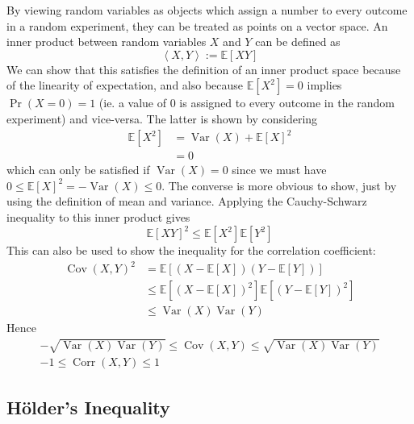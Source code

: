 \documentclass[11pt]{report} %
\begin{document}
By viewing random variables as objects which assign a number to every outcome in a random experiment, they can be treated as points on a vector space. An inner product between random variables $X$ and $Y$ can be defined as
\begin{equation}
\left\langle X, Y\right\rangle := \mathbb{E}\left[XY\right]
\end{equation}
We can show that this satisfies the definition of an inner product space because of the linearity of expectation, and also because $\mathbb{E}\left[X^{2}\right] = 0$ implies $\operatorname{Pr}\left(X = 0\right) = 1$ (ie. a value of $0$ is assigned to every outcome in the random experiment) and vice-versa. The latter is shown by considering
\begin{align}
\mathbb{E}\left[X^{2}\right] &= \operatorname{Var}\left(X\right) + \mathbb{E}\left[X\right]^{2} \\
&= 0
\end{align}
which can only be satisfied if $\operatorname{Var}\left(X\right) = 0$ since we must have $0 \leq \mathbb{E}\left[X\right]^{2} = -\operatorname{Var}\left(X\right) \leq 0$. The converse is more obvious to show, just by using the definition of mean and variance. Applying the Cauchy-Schwarz inequality to this inner product gives
\begin{equation}
\mathbb{E}\left[XY\right]^{2} \leq \mathbb{E}\left[X^{2}\right]\mathbb{E}\left[Y^{2}\right]
\end{equation}
This can also be used to show the inequality for the correlation coefficient:
\begin{align}
\operatorname{Cov}\left(X, Y\right)^{2} &= \mathbb{E}\left[\left(X - \mathbb{E}\left[X\right]\right)\left(Y - \mathbb{E}\left[Y\right]\right)\right] \\
&\leq \mathbb{E}\left[\left(X - \mathbb{E}\left[X\right]\right)^{2}\right]\mathbb{E}\left[\left(Y - \mathbb{E}\left[Y\right]\right)^{2}\right] \\
&\leq \operatorname{Var}\left(X\right)\operatorname{Var}\left(Y\right)
\end{align}
Hence
\begin{gather}
-\sqrt{\operatorname{Var}\left(X\right)\operatorname{Var}\left(Y\right)} \leq \operatorname{Cov}\left(X, Y\right) \leq \sqrt{\operatorname{Var}\left(X\right)\operatorname{Var}\left(Y\right)} \\
-1 \leq \operatorname{Corr}\left(X, Y\right) \leq 1
\end{gather}

\subsection{H\"{o}lder's Inequality}
\end{document}
